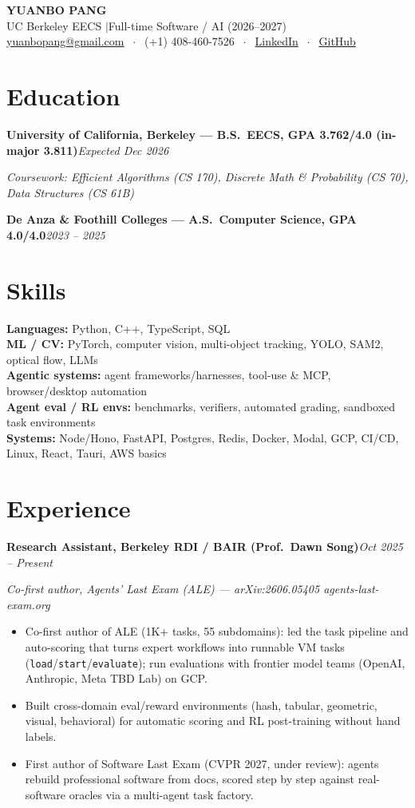 \documentclass[10pt, letterpaper]{article}
\newcommand{\role}[2]{%
  \vspace{3pt}%
  \noindent\textbf{#1}\hfill\textit{#2}\par
}
\newcommand{\rolesub}[1]{%
  \noindent\textit{#1}\par\vspace{1pt}%
}
\begin{document}
\begin{center}
  {\LARGE\bfseries YUANBO PANG}\\[4pt]
  {\large UC Berkeley EECS \quad$\vert$\quad Full-time Software / AI (2026--2027)}\\[4pt]
  \href{mailto:yuanbopang@gmail.com}{yuanbopang@gmail.com}
  $\;\cdot\;$ (+1) 408-460-7526
  $\;\cdot\;$ \href{https://www.linkedin.com/in/yuanbopang/}{LinkedIn}
  $\;\cdot\;$ \href{https://github.com/yuanboP}{GitHub}
\end{center}

\section{Education}
\role{University of California, Berkeley --- B.S.\ EECS, GPA 3.762/4.0 (in-major 3.811)}{Expected Dec 2026}
\rolesub{Coursework: Efficient Algorithms (CS 170), Discrete Math \& Probability (CS 70), Data Structures (CS 61B)}
\role{De Anza \& Foothill Colleges --- A.S.\ Computer Science, GPA 4.0/4.0}{2023 -- 2025}

\section{Skills}
\textbf{Languages:} Python, C++, TypeScript, SQL\\[1pt]
\textbf{ML / CV:} PyTorch, computer vision, multi-object tracking, YOLO, SAM2, optical flow, LLMs\\[1pt]
\textbf{Agentic systems:} agent frameworks/harnesses, tool-use \& MCP, browser/desktop automation\\[1pt]
\textbf{Agent eval / RL envs:} benchmarks, verifiers, automated grading, sandboxed task environments\\[1pt]
\textbf{Systems:} Node/Hono, FastAPI, Postgres, Redis, Docker, Modal, GCP, CI/CD, Linux, React, Tauri, AWS basics

\section{Experience}

\role{Research Assistant, Berkeley RDI / BAIR (Prof.\ Dawn Song)}{Oct 2025 -- Present}
\rolesub{Co-first author, Agents' Last Exam (ALE) --- arXiv:2606.05405 \quad agents-last-exam.org}
\begin{itemize}
  \item Co-first author of ALE (1K+ tasks, 55 subdomains): led the task pipeline and auto-scoring that turns expert workflows into runnable VM tasks (\texttt{load}/\texttt{start}/\texttt{evaluate}); run evaluations with frontier model teams (OpenAI, Anthropic, Meta TBD Lab) on GCP.
  \item Built cross-domain eval/reward environments (hash, tabular, geometric, visual, behavioral) for automatic scoring and RL post-training without hand labels.
  \item First author of Software Last Exam (CVPR 2027, under review): agents rebuild professional software from docs, scored step by step against real-software oracles via a multi-agent task factory.
\end{itemize}
\end{document}

